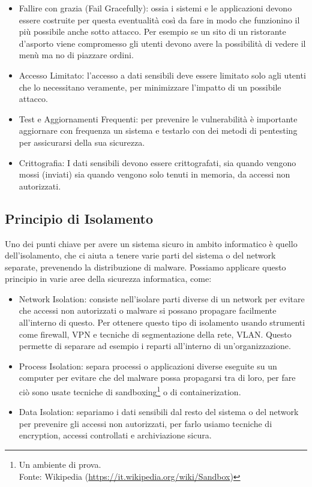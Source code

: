         \begin{samepage}
            \begin{itemize}
                \item Fallire con grazia (Fail Gracefully): ossia i sistemi e le applicazioni devono essere costruite per questa eventualità così da fare in modo che funzionino il più possibile anche sotto attacco. Per esempio se un sito di un ristorante d'asporto viene compromesso gli utenti devono avere la possibilità di vedere il menù ma no di piazzare ordini.
                \item Accesso Limitato: l'accesso a dati sensibili deve essere limitato solo agli utenti che
                lo necessitano veramente, per minimizzare l'impatto di un possibile attacco.
                \item Test e Aggiornamenti Frequenti: per prevenire le vulnerabilità è importante aggiornare con frequenza un sistema e testarlo con dei metodi di pentesting per assicurarsi della sua sicurezza.
                \item Crittografia: I dati sensibili devono essere crittografati, sia quando vengono mossi (inviati) sia quando vengono solo tenuti in memoria, da accessi non autorizzati.
            \end{itemize}
        \end{samepage}

        \subsection{Principio di Isolamento}
            Uno dei punti chiave per avere un sistema sicuro in ambito informatico è quello dell'isolamento, che ci aiuta a tenere varie parti del sistema o del network separate, prevenendo la distribuzione di malware. Possiamo applicare questo principio in varie aree della sicurezza informatica, come:
                \begin{itemize}
                    \item Network Isolation: consiste nell'isolare parti diverse di un network per evitare
                    che accessi non autorizzati o malware si possano propagare facilmente all'interno di questo. Per ottenere questo tipo di isolamento usando strumenti come firewall, VPN e tecniche di segmentazione della rete, VLAN. Questo permette di separare ad esempio i reparti all'interno di un'organizzazione.
                    \item Process Isolation: separa processi o applicazioni diverse eseguite su un computer
                    per evitare che del malware possa propagarsi tra di loro, per fare ciò sono usate tecniche
                    di sandboxing\footnote{ Un ambiente di prova. \\Fonte: Wikipedia (\url{https://it.wikipedia.org/wiki/Sandbox})} o di containerization.
                    \item Data Isolation: separiamo i dati sensibili dal resto del sistema o del network per prevenire gli accessi non autorizzati, per farlo usiamo tecniche di encryption, accessi controllati e archiviazione sicura.
                \end{itemize}

